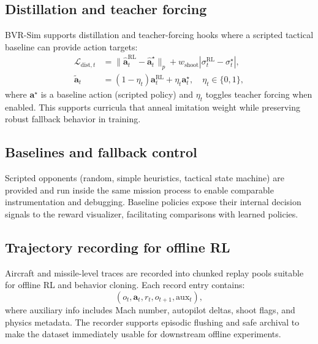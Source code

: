 \documentclass[11pt]{article}
\begin{document}
\subsection{Distillation and teacher forcing}
BVR-Sim supports distillation and teacher-forcing hooks where a scripted tactical baseline can provide action targets:
\begin{align}
\mathcal{L}_{\text{dist},t} &= \lVert \hat{\mathbf{a}}^{\text{RL}}_t - \hat{\mathbf{a}}^{\star}_t\rVert_p + w_{\text{shoot}}|\sigma^{\text{RL}}_t - \sigma^{\star}_t|, \label{eq:distill_loss}\\
\tilde{\mathbf{a}}_t &= (1-\eta_t)\mathbf{a}^{\text{RL}}_t + \eta_t\mathbf{a}^{\star}_t, \quad \eta_t\in\{0,1\}, \label{eq:teacher_force}
\end{align}
where $\mathbf{a}^\star$ is a baseline action (scripted policy) and $\eta_t$ toggles teacher forcing when enabled. This supports curricula that anneal imitation weight while preserving robust fallback behavior in training.

\subsection{Baselines and fallback control}
Scripted opponents (random, simple heuristics, tactical state machine) are provided and run inside the same mission process to enable comparable instrumentation and debugging. Baseline policies expose their internal decision signals to the reward visualizer, facilitating comparisons with learned policies.

\subsection{Trajectory recording for offline RL}
Aircraft and missile-level traces are recorded into chunked replay pools suitable for offline RL and behavior cloning. Each record entry contains:
\[
(o_t, \mathbf{a}_t, r_t, o_{t+1}, \text{aux}_t),
\]
where auxiliary info includes Mach number, autopilot deltas, shoot flags, and physics metadata. The recorder supports episodic flushing and safe archival to make the dataset immediately usable for downstream offline experiments.

\end{document}
